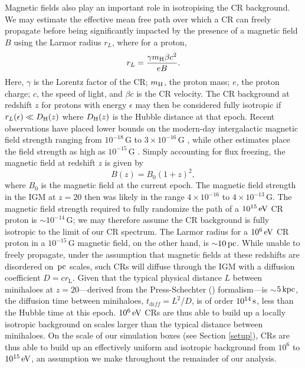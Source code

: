 \documentclass[../thesis.tex]{subfiles}
\begin{document}
Magnetic fields also play an important role in isotropising the CR background.  
We may estimate the effective mean free path over which a CR can freely propagate before being significantly impacted by the presence of a magnetic field $B$ using the Larmor radius $r_L$, where for a proton, 
\begin{equation}
r_L = \frac{\gamma m_{\mathrm{H}} \beta c^2}{eB}.
\end{equation}
Here, $\gamma$ is the Lorentz factor of the CR; $m_{\mathrm{H}}$, the proton mass; $e$, the proton charge; $c$, the speed of light, and $\beta c$ is the CR velocity. 
The CR background at redshift $z$ for protons with energy $\epsilon$ may then be considered fully isotropic if $r_L(\epsilon) \ll D_{\mathrm{H}}(z)$ where $D_{\mathrm{H}}(z)$ is the Hubble distance at that epoch. 
Recent observations have placed lower bounds on the modern-day intergalactic magnetic field strength ranging from $10^{-18}\,$G \citep{Dermeretal2011} to $3\times10^{-16}\,$G \citep{NeronovVovk2010}, while other estimates place the field strength as high as $10^{-15}\,$G \citep{AndoKusenko2010}.  
Simply accounting for flux freezing, the magnetic field at redshift $z$ is given by
\begin{equation}
B(z) = B_0 (1+z)^2,
\end{equation}
where $B_0$ is the magnetic field at the current epoch. 
The magnetic field strength in the IGM at $z=20$ then was likely in the range $4\times10^{-16}$ to $4\times10^{-13}\,$G.  
The magnetic field strength required to fully randomize the path of a $10^{15}\,\mathrm{eV}$ CR proton is $\sim$$10^{-14}\,$G; we may therefore assume the CR background is fully isotropic to the limit of our CR spectrum.  
The Larmor radius for a $10^6\,\mathrm{eV}$ CR proton in a $10^{-15}\,$G magnetic field, on the other hand, is $\sim$$10\,\mathrm{pc}$.  
While unable to freely propagate, under the assumption that magnetic fields at these redshifts are disordered on $\,\mathrm{pc}$ scales, such CRs will diffuse through the IGM with a diffusion coefficient $D = c r_{\mathrm L}$.  
Given that the typical physical distance $L$ between minihaloes at $z=20$---derived from the Press-Schechter (\citeyear{PressSchechter1974}) formalism---is $\sim$$5\,\mathrm{kpc}$, the diffusion time between minihaloes, $t_{\mathrm diff} = L^2/D$, is of order $10^{14}\,\mathrm{s}$, less than the Hubble time at this epoch.
$10^6\,\mathrm{eV}$ CRs are thus able to build up a locally isotropic background on scales larger than the typical distance between minihaloes.
On the scale of our simulation boxes (see Section \ref{setup}), CRs are thus able to build up an effectively uniform and isotropic background from $10^6$ to $10^{15}\,\mathrm{eV}$, an assumption we make throughout the remainder of our analysis.
\end{document}
